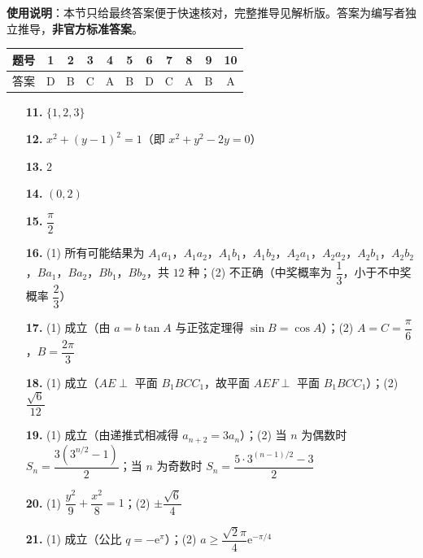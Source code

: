 
\begin{gknotice}
\textbf{使用说明}：本节只给最终答案便于快速核对，完整推导见解析版。答案为编写者独立推导，\textbf{非官方标准答案}。
\end{gknotice}

\begin{center}\begin{tabular}{ccccccccccc}
\toprule
题号 & 1 & 2 & 3 & 4 & 5 & 6 & 7 & 8 & 9 & 10 \\
\midrule
答案 & D & B & C & A & B & D & C & A & B & A \\
\bottomrule
\end{tabular}\end{center}

\begin{itemize}[leftmargin=2.6em]
  \item[\textbf{11.}] \(\{1,2,3\}\)
  \item[\textbf{12.}] \(x^2+(y-1)^2=1\)（即 \(x^2+y^2-2y=0\)）
  \item[\textbf{13.}] \(2\)
  \item[\textbf{14.}] \((0,2)\)
  \item[\textbf{15.}] \(\dfrac{\pi}{2}\)
\end{itemize}

\begin{itemize}[leftmargin=2.6em]
  \item[\textbf{16.}] (1) 所有可能结果为 \(A_1a_1\)，\(A_1a_2\)，\(A_1b_1\)，\(A_1b_2\)，\(A_2a_1\)，\(A_2a_2\)，\(A_2b_1\)，\(A_2b_2\)，\(Ba_1\)，\(Ba_2\)，\(Bb_1\)，\(Bb_2\)，共 \(12\) 种；(2) 不正确（中奖概率为 \(\dfrac13\)，小于不中奖概率 \(\dfrac23\)）
  \item[\textbf{17.}] (1) 成立（由 \(a=b\tan A\) 与正弦定理得 \(\sin B=\cos A\)）；(2) \(A=C=\dfrac{\pi}{6}\)，\(B=\dfrac{2\pi}{3}\)
  \item[\textbf{18.}] (1) 成立（\(AE\perp\) 平面 \(B_1BCC_1\)，故平面 \(AEF\perp\) 平面 \(B_1BCC_1\)）；(2) \(\dfrac{\sqrt6}{12}\)
  \item[\textbf{19.}] (1) 成立（由递推式相减得 \(a_{n+2}=3a_n\)）；(2) 当 \(n\) 为偶数时 \(S_n=\dfrac{3(3^{n/2}-1)}{2}\)；当 \(n\) 为奇数时 \(S_n=\dfrac{5\cdot3^{(n-1)/2}-3}{2}\)
  \item[\textbf{20.}] (1) \(\dfrac{y^2}{9}+\dfrac{x^2}{8}=1\)；(2) \(\pm\dfrac{\sqrt6}{4}\)
  \item[\textbf{21.}] (1) 成立（公比 \(q=-\mathrm{e}^{\pi}\)）；(2) \(a\geqslant\dfrac{\sqrt2\pi}{4}\mathrm{e}^{-\pi/4}\)
\end{itemize}
